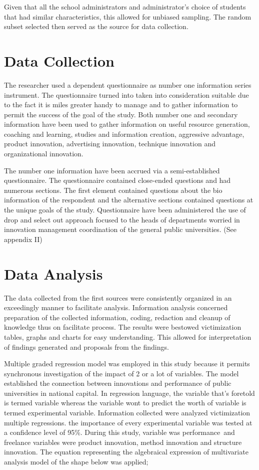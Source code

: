 Given that all the school administrators and administrator's choice of students that had similar characteristics, this allowed for unbiased sampling. The random subset selected then served as the source for data collection.

\section{\textbf{Data Collection}}
The researcher used a dependent questionnaire as number one information series instrument. The questionnaire turned into taken into consideration suitable due to the fact it is miles greater handy to manage and to gather information to permit the success of the goal of the study. Both number one and secondary information have been used to gather information on useful resource generation, coaching and learning, studies and information creation, aggressive advantage, product innovation, advertising innovation, technique innovation and organizational innovation.

The number one information have been accrued via a semi-established questionnaire. The questionnaire contained close-ended questions and had numerous sections. The first element contained questions about the bio information of the respondent and the alternative sections contained questions at the unique goals of the study. Questionnaire have been administered the use of drop and select out approach focused to the heads of departments worried in innovation management coordination of the general public universities. (See appendix II)

\section{\textbf{Data Analysis}}
The data collected from the first sources were consistently organized in an exceedingly manner to facilitate analysis. Information analysis concerned preparation of the collected information, coding, redaction and cleanup of knowledge thus on facilitate process. The results were bestowed victimization tables, graphs and charts for easy understanding. This allowed for interpretation of findings generated and proposals from the findings.

Multiple graded regression model was employed in this study because it permits synchronous investigation of the impact of 2 or a lot of variables. The model established the connection between innovations and performance of public universities in national capital. In regression language, the variable that's foretold is termed variable whereas the variable wont to predict the worth of variable is termed experimental variable. Information collected were analyzed victimization multiple regressions. the importance of every experimental variable was tested at a confidence level of 95\%. During this study, variable was performance\ and freelance variables were product innovation, method innovation and structure innovation. The equation representing the algebraical expression of multivariate analysis model of the shape below was applied;

